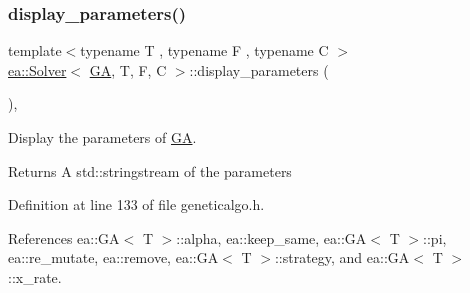 \subsubsection{\texorpdfstring{display\+\_\+parameters()}{display\_parameters()}}
{\footnotesize\ttfamily template$<$typename T , typename F , typename C $>$ \\
\hyperlink{classea_1_1_solver}{ea\+::\+Solver}$<$ \hyperlink{structea_1_1_g_a}{GA}, T, F, C $>$\+::display\+\_\+parameters (\begin{DoxyParamCaption}{ }\end{DoxyParamCaption})\hspace{0.3cm}{\ttfamily [inline]}, {\ttfamily [private]}}



Display the parameters of \hyperlink{structea_1_1_g_a}{GA}. 

\begin{DoxyReturn}{Returns}
A std\+::stringstream of the parameters 
\end{DoxyReturn}


Definition at line 133 of file geneticalgo.\+h.



References ea\+::\+G\+A$<$ T $>$\+::alpha, ea\+::keep\+\_\+same, ea\+::\+G\+A$<$ T $>$\+::pi, ea\+::re\+\_\+mutate, ea\+::remove, ea\+::\+G\+A$<$ T $>$\+::strategy, and ea\+::\+G\+A$<$ T $>$\+::x\+\_\+rate.


